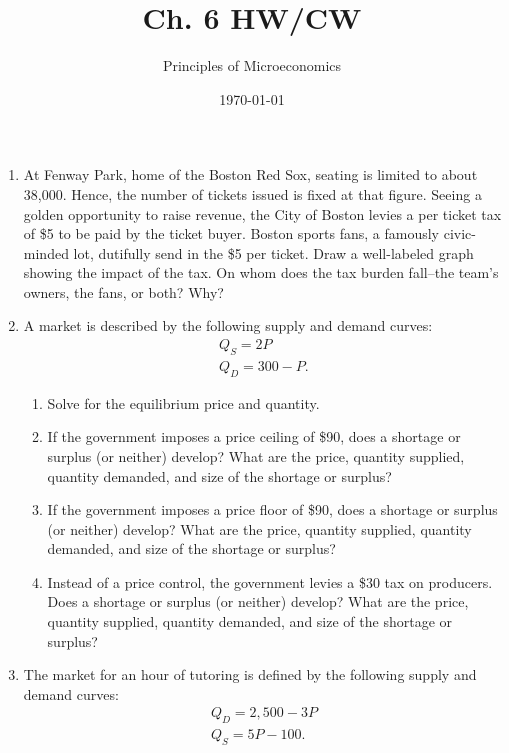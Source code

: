 \documentclass{article}
\title{Ch. 6 HW/CW}
\author{Principles of Microeconomics}
\date{\today}
\begin{document}
\maketitle

\begin{enumerate}

\item At Fenway Park, home of the Boston Red Sox, seating is limited to about 38,000. Hence, the number of tickets issued is fixed at that figure. Seeing a golden opportunity to raise revenue, the City of Boston levies a per ticket tax of \$5 to be paid by the ticket buyer. Boston sports fans, a famously civic-minded lot, dutifully send in the \$5 per ticket. Draw a well-labeled graph showing the impact of the tax. On whom does the tax burden fall--the team's owners, the fans, or both? Why?

\item A market is described by the following supply and demand curves:
	\begin{gather*}
	Q_S = 2P \\
	Q_D = 300 - P.
	\end{gather*}
	
	\begin{enumerate}
	
	\item Solve for the equilibrium price and quantity.
	
	\item If the government imposes a price ceiling of \$90, does a shortage or surplus (or neither) develop? What are the price, quantity supplied, quantity demanded, and size of the shortage or surplus?
	
	\item If the government imposes a price floor of \$90, does a shortage or surplus (or neither) develop? What are the price, quantity supplied, quantity demanded, and size of the shortage or surplus?
	
	\item Instead of a price control, the government levies a \$30 tax on producers. Does a shortage or surplus (or neither) develop? What are the price, quantity supplied, quantity demanded, and size of the shortage or surplus? 
	
	\end{enumerate}
	
\item The market for an hour of tutoring is defined by the following supply and demand curves:
	\begin{gather*}
	Q_D = 2,500 - 3P \\
	Q_S = 5P - 100.
	\end{gather*}
	

\end{enumerate}
\end{document}
